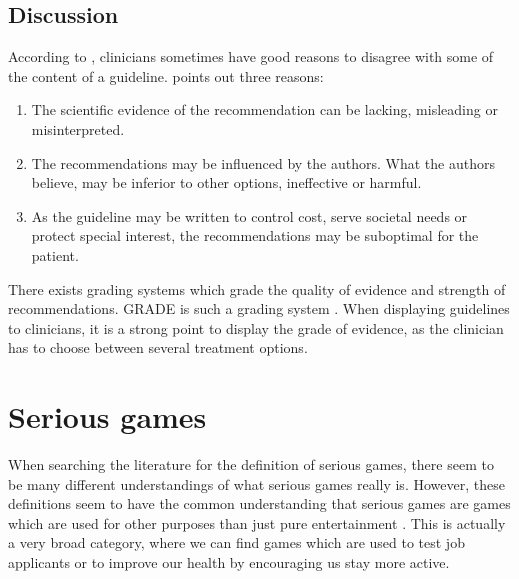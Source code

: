 \subsection{Discussion}
According to \textcite{Woolf1999}, clinicians sometimes have good reasons to disagree with some of the content of a guideline. \textcite{Woolf1999} points out three reasons:
\begin{enumerate}
	\item The scientific evidence of the recommendation can be lacking, misleading or misinterpreted.
	\item The recommendations may be influenced by the authors. What the authors believe, may be inferior to other options, ineffective or harmful.
	\item As the guideline may be written to control cost, serve societal needs or protect special interest, the recommendations may be suboptimal for the patient.
\end{enumerate}
There exists grading systems which grade the quality of evidence and strength of recommendations. GRADE is such a grading system \parencite{Guyatt2008}. When displaying guidelines to clinicians, it is a strong point to display the grade of evidence, as the clinician has to choose between several treatment options.




\section{Serious games}
When searching the literature for the definition of serious games, there seem to be many different understandings of what serious games really is. However, these definitions seem to have the common understanding that serious games are games which are used for other purposes than just pure entertainment \parencite{Susi2015}. This is actually a very broad category, where we can find games which are used to test job applicants or to improve our health by encouraging us stay more active.

